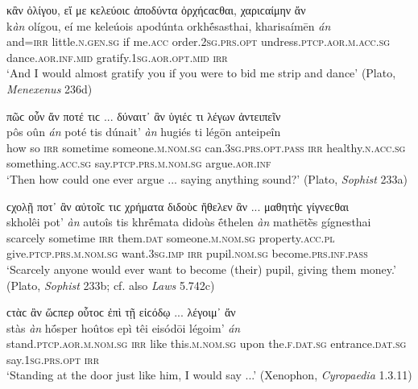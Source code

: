 \begin{exe}
\ex κἂν ὀλίγου, εἴ με κελεύοιϲ ἀποδύντα ὀρχήϲαϲθαι, χαριϲαίμην ἄν\\
\gll k\emph{àn} olígou, eí me keleúois apodúnta orkhḗsasthai, kharisaímēn \emph{án}\\
and=\textsc{irr} little.\textsc{n.gen.sg} if me.\textsc{acc} order.\textsc{2sg.prs.opt} undress.\textsc{ptcp.aor.m.acc.sg} dance.\textsc{aor.inf.mid} gratify.\textsc{1sg.aor.opt.mid} \textsc{irr}\\
\trans `And I would almost gratify you if you were to bid me strip and dance' (Plato, \textit{Menexenus} 236d)
\label{multian64}
\end{exe}

\begin{exe}
\ex πῶϲ οὖν ἄν ποτέ τιϲ ... δύναιτ᾽ ἂν ὑγιέϲ τι λέγων ἀντειπεῖν\\
\gll pôs oûn \emph{án} poté tis dúnait' \emph{àn} hugiés ti légōn anteipeîn\\
how so \textsc{irr} sometime someone.\textsc{m.nom.sg} can.\textsc{3sg.prs.opt.pass} \textsc{irr} healthy.\textsc{n.acc.sg} something.\textsc{acc.sg} say.\textsc{ptcp.prs.m.nom.sg} argue.\textsc{aor.inf}\\
\trans `Then how could one ever argue ... saying anything sound?' (Plato, \textit{Sophist} 233a)
\label{multian65}
\end{exe}

\begin{exe}
\ex ϲχολῇ ποτ᾽ ἂν αὐτοῖϲ τιϲ χρήματα διδοὺϲ ἤθελεν ἂν ... μαθητὴϲ γίγνεϲθαι\\
\gll skholêi pot' \emph{àn} autoîs tis khrḗmata didoùs ḗthelen \emph{àn} mathētḕs gígnesthai\\
scarcely sometime \textsc{irr} them.\textsc{dat} someone.\textsc{m.nom.sg} property.\textsc{acc.pl} give.\textsc{ptcp.prs.m.nom.sg} want.\textsc{3sg.imp} \textsc{irr} pupil.\textsc{nom.sg} become.\textsc{prs.inf.pass}\\
\trans `Scarcely anyone would ever want to become (their) pupil, giving them money.' (Plato, \textit{Sophist} 233b; cf. also \textit{Laws} 5.742c)
\label{multian66}
\end{exe}

\begin{exe}
\ex ϲτὰϲ ἂν ὥϲπερ οὗτοϲ ἐπὶ τῇ εἰϲόδῳ ... λέγοιμ᾽ ἄν\\
\gll stàs \emph{àn} hṓsper hoûtos epì têi eisódōi légoim' \emph{án}\\
stand.\textsc{ptcp.aor.m.nom.sg} \textsc{irr} like this.\textsc{m.nom.sg} upon the.\textsc{f.dat.sg} entrance.\textsc{dat.sg} say.\textsc{1sg.prs.opt} \textsc{irr}\\
\trans `Standing at the door just like him, I would say ...' (Xenophon, \textit{Cyropaedia} 1.3.11)
\label{multian67}
\end{exe}

